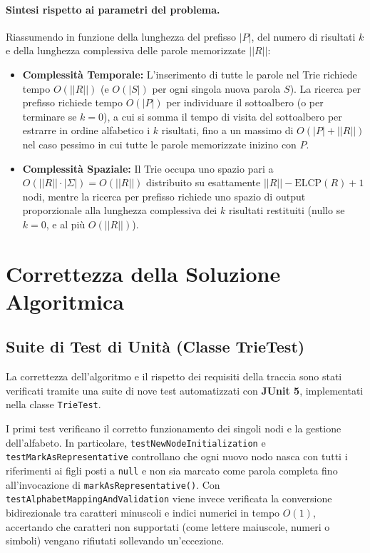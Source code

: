 \documentclass[11pt,a4paper]{article}
\begin{document}
\paragraph{Sintesi rispetto ai parametri del problema.}
Riassumendo in funzione della lunghezza del prefisso $|P|$, del numero di risultati $k$ e della lunghezza complessiva delle parole memorizzate $||R||$:
\begin{itemize}
    \item \textbf{Complessità Temporale:} L'inserimento di tutte le parole nel Trie richiede tempo $O(||R||)$ (e $O(|S|)$ per ogni singola nuova parola $S$). La ricerca per prefisso richiede tempo $O(|P|)$ per individuare il sottoalbero (o per terminare se $k = 0$), a cui si somma il tempo di visita del sottoalbero per estrarre in ordine alfabetico i $k$ risultati, fino a un massimo di $O(|P| + ||R||)$ nel caso pessimo in cui tutte le parole memorizzate inizino con $P$.
    \item \textbf{Complessità Spaziale:} Il Trie occupa uno spazio pari a $O(||R|| \cdot |\Sigma|) = O(||R||)$ distribuito su esattamente $||R|| - \text{ELCP}(R) + 1$ nodi, mentre la ricerca per prefisso richiede uno spazio di output proporzionale alla lunghezza complessiva dei $k$ risultati restituiti (nullo se $k = 0$, e al più $O(||R||)$).
\end{itemize}


\section{Correttezza della Soluzione Algoritmica}

\subsection{Suite di Test di Unità (Classe TrieTest)}
La correttezza dell'algoritmo e il rispetto dei requisiti della traccia sono stati verificati tramite una suite di nove test automatizzati con \textbf{JUnit 5}, implementati nella classe \texttt{TrieTest}.

I primi test verificano il corretto funzionamento dei singoli nodi e la gestione dell'alfabeto. In particolare, \texttt{testNewNodeInitialization} e \texttt{testMarkAsRepresentative} controllano che ogni nuovo nodo nasca con tutti i riferimenti ai figli posti a \texttt{null} e non sia marcato come parola completa fino all'invocazione di \texttt{markAsRepresentative()}. Con \texttt{testAlphabetMappingAndValidation} viene invece verificata la conversione bidirezionale tra caratteri minuscoli e indici numerici in tempo $O(1)$, accertando che caratteri non supportati (come lettere maiuscole, numeri o simboli) vengano rifiutati sollevando un'eccezione.
\end{document}
